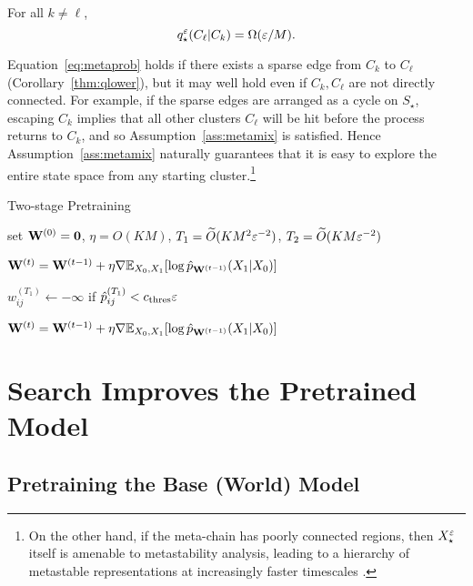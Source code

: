 \begin{ass}\label{ass:metamix}
For all $k\neq\ell$,
\begin{equation}\label{eq:metaprob}
q_\star^\varepsilon(C_\ell|C_k)=\Omega(\varepsilon/M).
\end{equation}
\end{ass}

Equation~\eqref{eq:metaprob} holds if there exists a sparse edge from $C_k$ to $C_\ell$ (Corollary~\ref{thm:qlower}), but it may well hold even if $C_k,C_\ell$ are not directly connected. For example, if the sparse edges are arranged as a cycle on $S_\star$, escaping $C_k$ implies that all other clusters $C_\ell$ will be hit before the process returns to $C_k$, and so Assumption~\ref{ass:metamix} is satisfied. Hence Assumption~\ref{ass:metamix} naturally guarantees that it is easy to explore the entire state space from any starting cluster.\footnote{On the other hand, if the meta-chain has poorly connected regions, then $X_\star^\varepsilon$ itself is amenable to metastability analysis, leading to a hierarchy of metastable representations at increasingly faster timescales \citep{Wicks05}.}


\begin{algorithm}[t]
\caption{Two-stage Pretraining}
\label{alg:pre}
\begin{algorithmic}[1]
\STATE set $\mathbf{W}^{(0)} = \boldsymbol{0}$, $\eta=O(KM)$,
\STATE $T_1=\widetilde{O}(KM^2\varepsilon^{-2})$, $T_2=\widetilde{O}(KM\varepsilon^{-2})$

\STATE $\mathbf{W}^{(t)} = \mathbf{W}^{(t-1)} + \eta\nabla \mathbb{E}_{X_0,X_1}[\log\hat{p}_{\mathbf{W}^{(t-1)}}(X_1|X_0)]$
\ENDFOR

\STATE $w_{ij}^{(T_1)} \gets -\infty$ if $\hat{p}_{ij}^{(T_1)} < c_{\operatorname{thres}}\varepsilon$ 

\STATE $\mathbf{W}^{(t)} = \mathbf{W}^{(t-1)} + \eta\nabla \mathbb{E}_{X_0,X_1}[\log\hat{p}_{\mathbf{W}^{(t-1)}}(X_1|X_0)]$
\ENDFOR
\end{algorithmic}
\end{algorithm}


\section{Search Improves the Pretrained Model}\label{sec:search}


\subsection{Pretraining the Base (World) Model}

